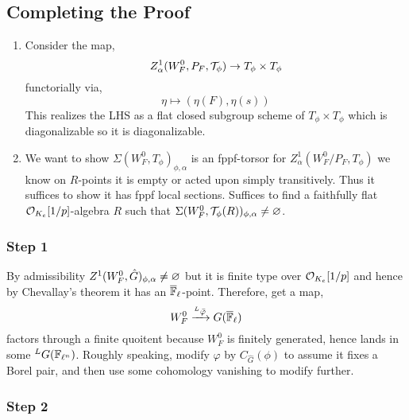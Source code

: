 \documentclass[12pt]{article}
\begin{document}
\subsection{Completing the Proof}

\begin{enumerate}
\item Consider the map, 
\[ Z^1_\alpha(W_F^0,P_F, \mathcal{T}_\phi) \to T_\phi \times T_\phi \]
functorially via,
\[ \eta \mapsto (\eta(F), \eta(s)) \]
This realizes the LHS as a flat closed subgroup scheme of $T_\phi \times T_\phi$ which is diagonalizable so it is diagonalizable. 

\item We want to show $\Sigma(W_F^0, T_\phi)_{\phi, \alpha}$ is an fppf-torsor for $Z^1_\alpha(W_F^0/P_F, T_\phi)$ we know on $R$-points it is empty or acted upon simply transitively. Thus it suffices to show it has fppf local sections. Suffices to find a faithfully flat $\mathcal{O}_{K_e}[1/p]$-algebra $R$ such that $\Sigma(W_F^0, \mathcal{T}_\phi(R))_{\phi, \alpha} \neq \varnothing$. 
\end{enumerate}

\subsubsection{Step 1}

By admissibility $Z^1(W_F^0, \hat{G})_{\phi, \alpha} \neq \varnothing$ but it is finite type over $\mathcal{O}_{K_e}[1/p]$ and hence by Chevallay's theorem it has an $\overline{\mathbb{F}}_\ell$-point. Therefore, get a map,
\[ W_F^0 \xrightarrow{{}^L \bar{\varphi}} G(\overline{\mathbb{F}}_\ell) \]
factors through a finite quoitent because $W_F^0$ is finitely generated, hence lands in some ${}^L G(\mathbb{F}_{\ell^n})$. Roughly speaking, modify $\varphi$ by $C_{\hat{G}}(\phi)$ to assume it fixes a Borel pair, and then use some cohomology vanishing to modify further. 

\subsubsection{Step 2}
\end{document}
